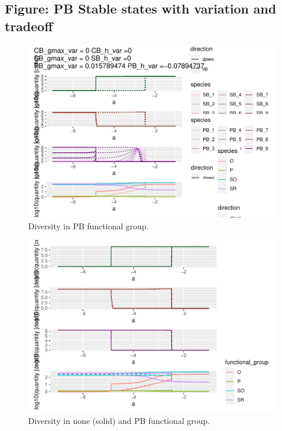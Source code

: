 \documentclass{article}
\begin{document}
\hypertarget{figure-pb-stable-states-with-variation-and-tradeoff}{%
\subsection{Figure: PB Stable states with variation and
tradeoff}\label{figure-pb-stable-states-with-variation-and-tradeoff}}

\begin{figure}

{\centering \includegraphics[width=1\linewidth]{article_files/figure-latex/PB_var1-1} 

}

\caption{Diversity in PB functional group.}\label{fig:PB_var1}
\end{figure}

\begin{figure}

{\centering \includegraphics[width=1\linewidth]{article_files/figure-latex/PB_var2-1} 

}

\caption{Diversity in none (solid) and PB functional group.}\label{fig:PB_var2}
\end{figure}
\end{document}
